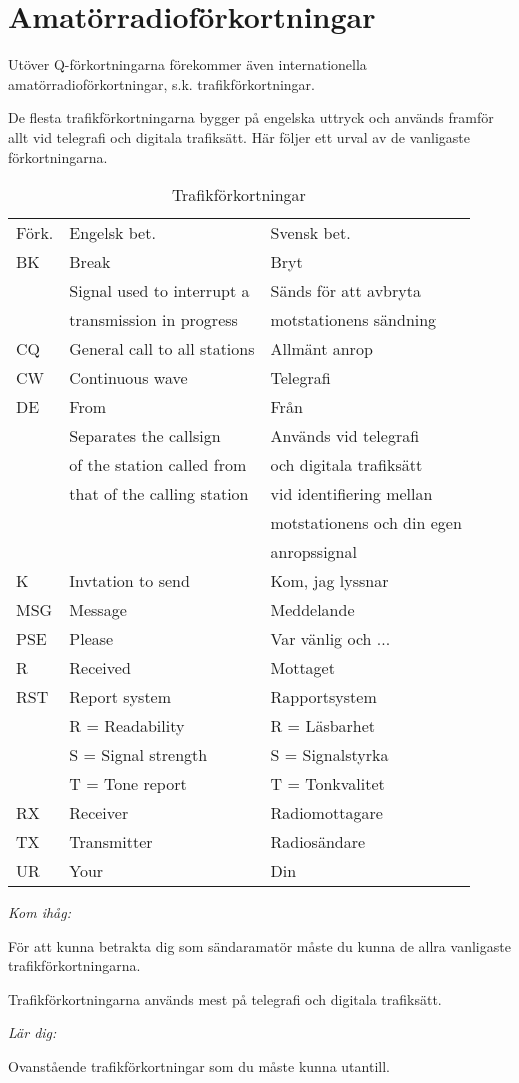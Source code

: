\section{Amatörradioförkortningar}

Utöver Q-förkortningarna förekommer även internationella
amatörradioförkortningar, s.k. trafikförkortningar.

De flesta trafikförkortningarna bygger på engelska uttryck och används
framför allt vid telegrafi och digitala trafiksätt. Här följer ett
urval av de vanligaste förkortningarna.

\begin{table}[h]
  \begin{tabular}{lll}
    Förk. & Engelsk bet. & Svensk bet.\\
    BK & Break & Bryt\\
    & Signal used to interrupt a & Sänds för att avbryta\\
    & transmission in progress  & motstationens sändning\\
    CQ & General call to all stations & Allmänt anrop\\
    CW & Continuous wave & Telegrafi\\
    DE & From & Från\\
    & Separates the callsign      & Används vid telegrafi \\
    & of the station called from  & och digitala trafiksätt\\
    & that of the calling station & vid identifiering mellan\\
    &                             & motstationens och din egen\\
    &                             & anropssignal\\
    K & Invtation to send & Kom, jag lyssnar\\
    MSG & Message & Meddelande\\
    PSE & Please & Var vänlig och ...\\
    R & Received & Mottaget\\
    RST & Report system & Rapportsystem\\
    & R = Readability & R = Läsbarhet\\
    & S = Signal strength & S = Signalstyrka\\
    & T = Tone report & T = Tonkvalitet\\
    RX & Receiver & Radiomottagare\\
    TX & Transmitter & Radiosändare\\
    UR & Your & Din\\
  \end{tabular}
  \caption{Trafikförkortningar}
  \label{tab:trafikforkortningar}
\end{table}

\emph{Kom ihåg:}

För att kunna betrakta dig som sändaramatör måste du kunna de allra
vanligaste trafikförkortningarna.

Trafikförkortningarna används mest på telegrafi och digitala
trafiksätt.

\emph{Lär dig:}

Ovanstående trafikförkortningar som du måste kunna utantill.
